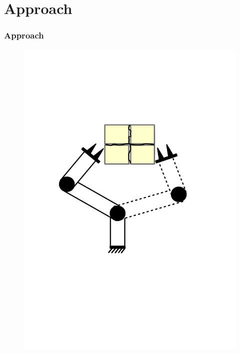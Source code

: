 \documentclass{beamer}
\begin{document}
\section{Approach}

\begin{frame}
	\frametitle{Approach}
\begin{figure}
\centering
\begin{minipage}{.45\textwidth}
  \centering
  \includegraphics[trim=0 300 0 250,width=0.9\linewidth]{images/tiles_robot}
\end{minipage}
\hspace{-1cm}
\begin{minipage}{.45\textwidth}
  \centering
\vspace{2cm}

\end{minipage}
\end{figure}
\end{frame}
\end{document}
